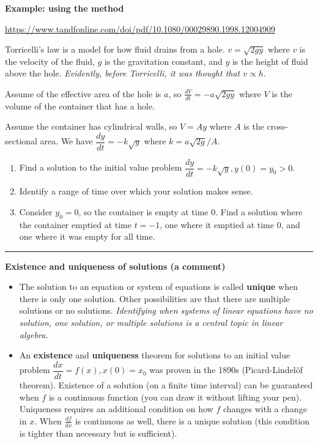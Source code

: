 \documentclass[12pt,letterpaper,noanswers]{exam}
\begin{document}
\noindent\textbf{Example: using the method}

\url{https://www.tandfonline.com/doi/pdf/10.1080/00029890.1998.12004909}

Torricelli's law is a model for how fluid drains from a hole.  $v = \sqrt{2gy}$ where $v$ is the velocity of the fluid, $g$ is the gravitation constant, and $y$ is the height of fluid above the hole.  \emph{Evidently, before Torricelli, it was thought that $v \propto h$.}

Assume of the effective area of the hole is $a$, so $\frac{dV}{dt} = -a\sqrt{2gy}$ where $V$ is the volume of the container that has a hole.

Assume the container has cylindrical walls, so $V = Ay$ where $A$ is the cross-sectional area.  We have $\dfrac{dy}{dt} = -k\sqrt{y}$ where $k = a\sqrt{2g}/A$.
\begin{enumerate}
    \item Find a solution to the initial value problem $\dfrac{dy}{dt} = -k\sqrt{y}, y(0) = y_0>0$.
    \vspace{2in}
    
    \item Identify a range of time over which your solution makes sense.
    \vspace{2in}
    
    \item Consider $y_0 = 0$, so the container is empty at time $0$.  Find a solution where the container emptied at time $t = -1$, one where it emptied at time $0$, and one where it was empty for all time.
    \vspace{2.5in}
\end{enumerate}

\eject

\vspace{0.2cm}
\hrule
\vspace{0.2cm}


\noindent\textbf{Existence and uniqueness of solutions (a comment)}
\begin{tcolorbox}
\begin{itemize}
\itemsep0em
\item The solution to an equation or system of equations is called \textbf{unique} when there is only one solution.  Other possibilities are that there are multiple solutions or no solutions.  \emph{Identifying when systems of linear equations have no solution, one solution, or multiple solutions is a central topic in linear algebra.}
\item An \textbf{existence} and \textbf{uniqueness} theorem for solutions to an initial value problem $\dfrac{dx}{dt} = f(x), x(0) = x_0$ was proven in the 1890s (Picard-Lindelöf theorem).  Existence of a solution (on a finite time interval) can be guaranteed when $f$ is a continuous function (you can draw it without lifting your pen).  Uniqueness requires an additional condition on how $f$ changes with a change in $x$.  When $\frac{df}{dx}$ is continuous as well, there is a unique solution (this condition is tighter than necessary but is sufficient).  
\end{itemize}
\end{tcolorbox}
\end{document}
